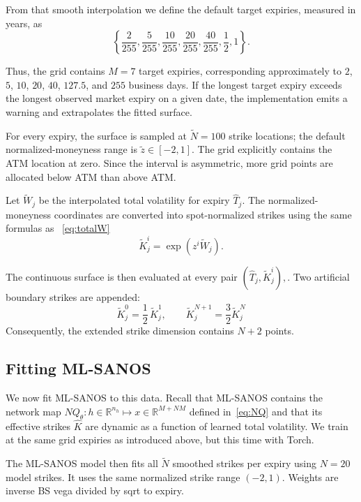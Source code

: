 \documentclass[11pt,a4paper]{article}
\newcommand{\R}{\mathbb{R}}
\begin{document}
From that smooth interpolation we define
the default target expiries, measured in years, as
%
\[
    \left\{
        \frac{2}{255},
        \frac{5}{255},
        \frac{10}{255},
        \frac{20}{255},
        \frac{40}{255},
        \frac{1}{2},
        1
    \right\}.
\]

Thus, the grid contains $
    M=7
$
target expiries, corresponding approximately to \(2\), \(5\), \(10\), \(20\), \(40\), \(127.5\), and \(255\) business days.
If the longest target expiry exceeds the longest observed market expiry on a given date, the implementation emits a warning and extrapolates the fitted surface.

For every expiry, the surface is sampled at
$
   \tilde  N = 100
$
strike locations; the default normalized-moneyness range is
$
    \tilde  z \in [-2,1]
$.
The grid explicitly contains the ATM location at zero. Since the interval is asymmetric, more grid points are allocated below ATM than above ATM.

Let \( \tilde W_j\) be the interpolated total volatility for expiry \(\hat T_j\). The normalized-moneyness coordinates are converted into spot-normalized strikes using
the same formulas as ~\eqref{eq:totalW}
\[
    \tilde {K}^i_j
    =
    \exp\left( z^i
        \tilde W_j
    \right).
\]

The continuous surface is then evaluated at every pair
$    \left(\hat T_j, \tilde {K}^i_j\right),
$.
Two artificial boundary strikes are appended:
%
\[
    \tilde K^0_j
    =
    \frac{1}{2}\,\tilde K^1_j,
    \qquad
    \tilde K_j^{N+1}
    =
    \frac{3}{2} \tilde K_j^N
\]
Consequently, the extended strike dimension contains \(N+2\) points.

\subsection{Fitting ML-SANOS}

We now fit ML-SANOS to this data. Recall that ML-SANOS contains the network map 
$NQ_\theta :  h \in \R^{n_h} \longmapsto x \in \R^{M+NM}$ defined in~\eqref{eq:NQ}
and that its effective strikes $\hat K$ are dynamic as a function of learned total volatility.
We train at the same grid expiries as introduced above, but this time with Torch.

The ML-SANOS model then fits
all $\tilde N$ smoothed strikes per expiry using $N=20$ model strikes. It uses the
same normalized strike range $(-2,1)$. Weights are inverse BS vega divided by sqrt to expiry.




\newpage 
   
   
\end{document}
